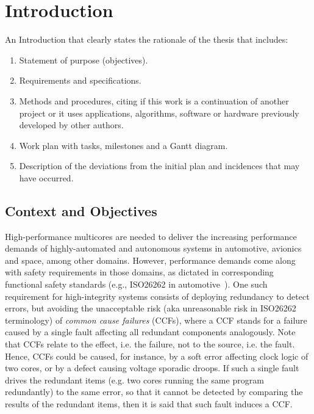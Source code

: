 \clearpage
\newpage
\section{Introduction}

{\color{magenta}
{An Introduction that clearly states the rationale of the thesis that includes:}

\begin{enumerate}
\item {Statement of purpose (objectives).}
\item {Requirements and specifications.}
\item {Methods and procedures, citing if this work is a continuation of another project or it uses applications, algorithms,
software or hardware previously developed by other authors.}
\item {Work plan with tasks, milestones and a Gantt diagram.}
\item {Description of the deviations from the initial plan and incidences that may have occurred. }
\end{enumerate}
}

\bigskip


\subsection{Context and Objectives}

High-performance multicores are needed to deliver the increasing performance demands of highly-automated and autonomous systems in automotive, avionics and space, among other domains. However, performance demands come along with safety requirements in those domains, as dictated in corresponding functional safety standards (e.g., ISO26262 in automotive~\cite{ISO26262}).
One such requirement for high-integrity systems consists of deploying redundancy to detect errors, but avoiding the unacceptable risk (aka unreasonable risk in ISO26262 terminology) of \emph{common cause failures} (CCFs), where a CCF stands for a failure caused by a single fault affecting all redundant components analogously. Note that CCFs relate to the effect, i.e. the failure, not to the source, i.e. the fault. Hence, CCFs could be caused, for instance, by a soft error affecting clock logic of two cores, or by a defect causing voltage sporadic droops. If such a single fault drives the redundant items (e.g. two cores running the same program redundantly) to the same error, so that it cannot be detected by comparing the results of the redundant items, then it is said that such fault induces a CCF.

